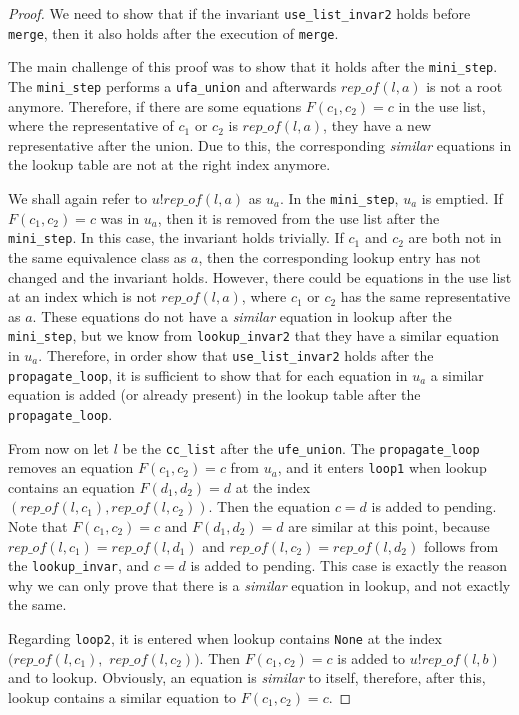 \begin{proof}
We need to show that if the invariant \lstinline{use_list_invar2} holds before \lstinline{merge}, then it also holds after the execution of \lstinline|merge|.

The main challenge of this proof was to show that it holds after the \lstinline|mini_step|.
The \lstinline|mini_step| performs a \lstinline|ufa_union| and afterwards $rep\_of(l, a)$ is not a root anymore.
Therefore, if there are some equations $F(c_1, c_2) = c$ in the use list, where the representative of $c_1$ or $c_2$ is $rep\_of(l,a)$, they have a new representative after the union. Due to this, the corresponding \emph{similar} equations in the lookup table are not at the right index anymore.

We shall again refer to $u ! rep\_of (l, a)$ as $u_a$.
In the \lstinline{mini_step}, $u_a$ is emptied.
If $F(c_1, c_2) = c$ was in $u_a$, then it is removed from the use list after the \lstinline|mini_step|. In this case, the invariant holds trivially.
If $c_1$ and $c_2$ are both not in the same equivalence class as $a$, then the corresponding lookup entry has not changed and the invariant holds.
However, there could be equations in the use list at an index which is not $rep\_of(l, a)$, where $c_1$ or $c_2$ has the same representative as $a$. These equations do not have a \emph{similar} equation in lookup after the \lstinline{mini_step}, but we know from \lstinline{lookup_invar2} that they have a similar equation in $u_a$.
Therefore, in order show that \lstinline{use_list_invar2} holds after the \lstinline{propagate_loop}, it is sufficient to show that for each equation in $u_a$ a similar equation is added (or already present) in the lookup table after the \lstinline{propagate_loop}.

From now on let $l$ be the \lstinline{cc_list} after the \lstinline{ufe_union}.
The \lstinline{propagate_loop} removes an equation $F(c_1, c_2) = c$ from $u_a$, and it enters \lstinline{loop1} when lookup contains an equation $F(d_1, d_2) = d$ at the index $(rep\_of(l, c_1), rep\_of(l, c_2))$.
Then the equation $c = d$ is added to pending. Note that $F(c_1, c_2) = c$ and $F(d_1, d_2) = d$ are similar at this point, because $rep\_of(l, c_1) = rep\_of(l, d_1)$ and $rep\_of(l, c_2) = rep\_of(l, d_2)$ follows from the \lstinline{lookup_invar}, and $c = d$ is added to pending.
This case is exactly the reason why we can only prove that there is a \emph{similar} equation in lookup, and not exactly the same.

Regarding \lstinline{loop2}, it is entered when lookup contains \lstinline{None} at the index
$(rep\_of(l, c_1),$ $rep\_of(l, c_2))$. Then $F(c_1, c_2) = c$ is added to $u ! rep\_of(l, b)$ and to lookup. Obviously, an equation is \emph{similar} to itself, therefore, after this, lookup contains a similar equation to $F(c_1, c_2) = c$.
\end{proof}

